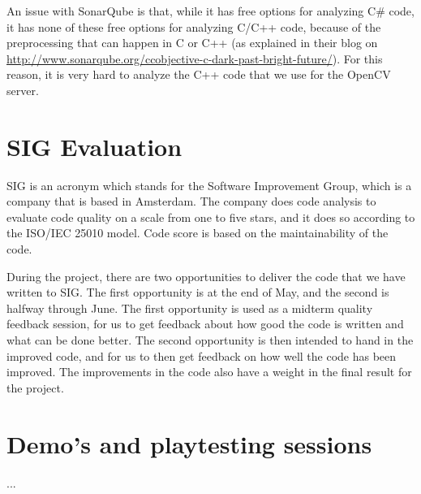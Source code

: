 		An issue with SonarQube is that, while it has free options for analyzing
		C\# code, it has none of these free options for analyzing C/C++ code,
		because of the preprocessing that can happen in C or C++ (as explained
		in their blog on \url{http://www.sonarqube.org/ccobjective-c-dark-past-bright-future/}).
		For this reason, it is very hard to analyze the C++ code that we use for the
		OpenCV server.
		
	\section{SIG Evaluation} \label{sec:sigevaluation}
		SIG is an acronym which stands for the Software Improvement Group,
		which is a company that is based in Amsterdam. The company does code
		analysis to evaluate code quality on a scale from one to five stars,
		and it does so according to the ISO/IEC 25010 model. Code score is 
		based on the maintainability of the code.
		
		During the project, there are two opportunities to deliver the code 
		that we have written to SIG. The first opportunity is at the end of 
		May, and the second is halfway through June. The first opportunity 
		is used as a midterm quality feedback session, for us to get feedback 
		about how good the code is written and what can be done better. The 
		second opportunity is then intended to hand in the improved code, 
		and for us to then get feedback on how well the code has been improved. 
		The improvements in the code also have a weight in the final result 
		for the project.
		
	\section{Demo's and playtesting sessions} \label{sec:demos}
		...
